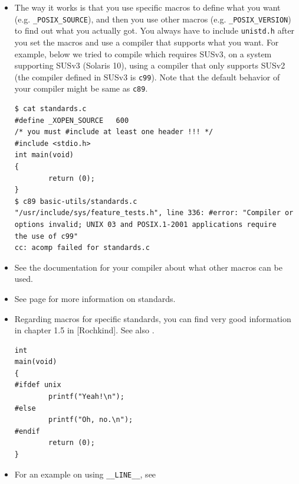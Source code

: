 \begin{itemize}
\item The way it works is that you use specific macros to define what you
want (e.g. \texttt{\_POSIX\_SOURCE}), and then you use other macros (e.g.
\texttt{\_POSIX\_VERSION}) to find out what you actually got.  You always have
to include \texttt{unistd.h} after you set the macros and use a compiler that
supports what you want.  For example, below we tried to compile
 which requires SUSv3, on a system supporting
SUSv3 (Solaris 10), using a compiler that only supports SUSv2 (the compiler
defined in SUSv3 is \texttt{c99}).  Note that the default behavior of your
compiler might be same as \texttt{c89}.

\begin{verbatim}
$ cat standards.c 
#define _XOPEN_SOURCE   600
/* you must #include at least one header !!! */
#include <stdio.h>
int main(void)
{
        return (0);
}
$ c89 basic-utils/standards.c 
"/usr/include/sys/feature_tests.h", line 336: #error: "Compiler or
options invalid; UNIX 03 and POSIX.1-2001 applications require
the use of c99"
cc: acomp failed for standards.c
\end{verbatim}
\item See the documentation for your compiler about what other macros can be
used.
\item See page \pageref{C_LANGUAGE} for more information on standards.
\item Regarding macros for specific standards, you can find very good
information in chapter 1.5 in [Rochkind]. See also
.

\begin{verbatim}
int
main(void)
{
#ifdef unix
        printf("Yeah!\n");
#else
        printf("Oh, no.\n");
#endif
        return (0);
}
\end{verbatim}
\item For an example on using \texttt{\_\_LINE\_\_}, see
\end{itemize}



